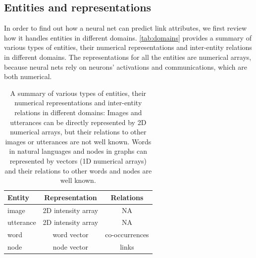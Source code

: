 \documentclass[twocolumn]{article}
\begin{document}
\subsection{Entities and representations}
In order to find out how a neural net can predict link attributes, we first 
review how it handles entities in different domains.
\autoref{tab:domains} provides a summary of various types of entities, their 
numerical representations and inter-entity relations in different domains.
The representations for all the entities are numerical arrays, 
because neural nets rely on neurons' activations and communications, which 
are both numerical.
\begin{table}[h]
	\centering
	\caption{A summary of various types of entities, their numerical
		representations and inter-entity relations in different domains:
		Images and utterances can be directly represented by 2D numerical 
		arrays, 
		but their relations to other images or utterances are not well known. 
		Words in natural languages and nodes in graphs can represented by 
		vectors (1D numerical arrays) and their relations to other words and 
		nodes are well known.}
	\begin{tabularx}{0.5\textwidth}{|X|c|c| }  \hline
 \textbf{Entity} & \textbf{Representation} & \textbf{Relations} \\ \hline
	 image & 2D intensity array & NA \\ \hline
	 utterance & 2D intensity array & NA \\ \hline
	 word & word vector & co-occurrences \\ \hline
	 node & node vector & links \\ \hline
	\end{tabularx}
	\label{tab:domains}
\end{table}
\end{document}
